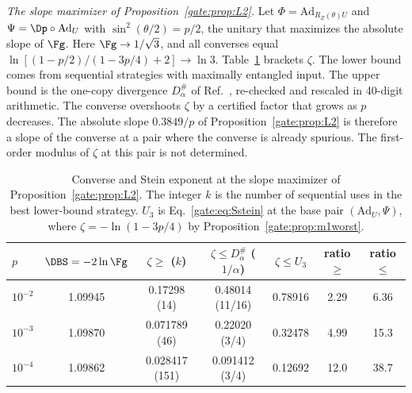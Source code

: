 \emph{The slope maximizer of Proposition~\ref{gate:prop:L2}.} Let $\Phi=\mathrm{Ad}_{R_Z(\theta)U}$ and $\Psi=\Dp\circ\mathrm{Ad}_U$ with $\sin^2(\theta/2)=p/2$, the unitary that maximizes the absolute slope of $\Fg$. Here $\Fg\to1/\sqrt3$, and all converses equal $\ln[(1-p/2)/(1-3p/4)+2]\to\ln3$. Table~\ref{gate:tab:m1L2} brackets $\zeta$. The lower bound comes from sequential strategies with maximally entangled input. The upper bound is the one-copy divergence $D^\#_\alpha$ of Ref.~\cite{FawziFawzi2021}, re-checked and rescaled in 40-digit arithmetic. The converse overshoots $\zeta$ by a certified factor that grows as $p$ decreases. The absolute slope $0.3849/p$ of Proposition~\ref{gate:prop:L2} is therefore a slope of the converse at a pair where the converse is already spurious. The first-order modulus of $\zeta$ at this pair is not determined.

\begin{table}[!tbp]
\centering
\caption{Converse and Stein exponent at the slope maximizer of Proposition~\ref{gate:prop:L2}. The integer $k$ is the number of sequential uses in the best lower-bound strategy. $U_3$ is Eq.~\eqref{gate:eq:Sstein} at the base pair $(\mathrm{Ad}_U,\Psi)$, where $\zeta=-\ln(1-3p/4)$ by Proposition~\ref{gate:prop:m1worst}.}
\label{gate:tab:m1L2}
\begin{tabular}{lcccccc}
\toprule
$p$ & $\DBS=-2\ln\Fg$ & $\zeta\ge$ ($k$) & $\zeta\le D^\#_\alpha$ ($1/\alpha$) & $\zeta\le U_3$ & ratio $\ge$ & ratio $\le$\\
\midrule
$10^{-2}$ & 1.09945 & 0.17298 (14) & 0.48014 (11/16) & 0.78916 & 2.29 & 6.36\\
$10^{-3}$ & 1.09870 & 0.071789 (46) & 0.22020 (3/4) & 0.32478 & 4.99 & 15.3\\
$10^{-4}$ & 1.09862 & 0.028417 (151) & 0.091412 (3/4) & 0.12692 & 12.0 & 38.7\\
\bottomrule
\end{tabular}
\end{table}

